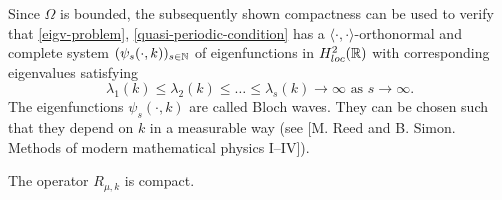 	Since $\Omega$ is bounded, the subsequently shown compactness can be used to verify that \eqref{eigv-problem}, \eqref{quasi-periodic-condition} has a $\langle \cdot , \cdot \rangle$-orthonormal and complete system $(\psi_{s}(\cdot, k))_{s \in \mathbb{N}}$ of eigenfunctions in $H^{2}_{loc}(\mathbb{R})$ with corresponding eigenvalues satisfying	
	\[ \lambda_{1}(k) \leq \lambda_{2}(k) \leq \dotsc \leq \lambda_{s}(k) \rightarrow \infty \text{ as } s \rightarrow \infty. \]
	The eigenfunctions $\psi_{s}(\cdot, k)$ are called Bloch waves. They can be chosen such that they depend on $k$ in a measurable way (see [M. Reed and B. Simon. Methods of modern mathematical physics I–IV]). %
	
\begin{theorem}
	The operator $R_{\mu, k}$ is compact. %


\end{theorem}
